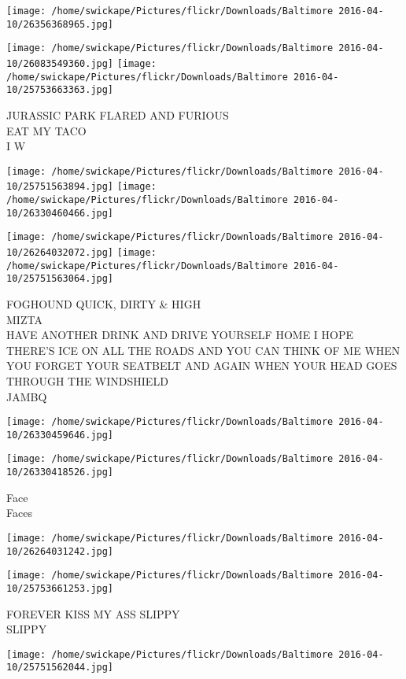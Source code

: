 \documentclass[10pt,letterpaper]{article}
\begin{document}
\texttt{[image: /home/swickape/Pictures/flickr/Downloads/Baltimore 2016-04-10/26356368965.jpg]}

\vspace{0.25in}
\texttt{[image: /home/swickape/Pictures/flickr/Downloads/Baltimore 2016-04-10/26083549360.jpg]}
\texttt{[image: /home/swickape/Pictures/flickr/Downloads/Baltimore 2016-04-10/25753663363.jpg]}

JURASSIC PARK FLARED AND FURIOUS\\
EAT MY TACO\\
I W
\pagebreak

\texttt{[image: /home/swickape/Pictures/flickr/Downloads/Baltimore 2016-04-10/25751563894.jpg]}
\texttt{[image: /home/swickape/Pictures/flickr/Downloads/Baltimore 2016-04-10/26330460466.jpg]}

\texttt{[image: /home/swickape/Pictures/flickr/Downloads/Baltimore 2016-04-10/26264032072.jpg]}
\texttt{[image: /home/swickape/Pictures/flickr/Downloads/Baltimore 2016-04-10/25751563064.jpg]}

FOGHOUND QUICK, DIRTY \& HIGH\\
MIZTA\\
HAVE ANOTHER DRINK AND DRIVE YOURSELF HOME I HOPE THERE'S ICE ON ALL THE ROADS AND YOU CAN THINK OF ME WHEN YOU FORGET YOUR SEATBELT AND AGAIN WHEN YOUR HEAD GOES THROUGH THE WINDSHIELD\\
JAMBQ
\pagebreak

\texttt{[image: /home/swickape/Pictures/flickr/Downloads/Baltimore 2016-04-10/26330459646.jpg]}

\vspace{0.25in}
\texttt{[image: /home/swickape/Pictures/flickr/Downloads/Baltimore 2016-04-10/26330418526.jpg]}

Face\\
Faces
\pagebreak

\texttt{[image: /home/swickape/Pictures/flickr/Downloads/Baltimore 2016-04-10/26264031242.jpg]}

\vspace{0.25in}
\texttt{[image: /home/swickape/Pictures/flickr/Downloads/Baltimore 2016-04-10/25753661253.jpg]}

FOREVER KISS MY ASS SLIPPY\\
SLIPPY
\pagebreak

\texttt{[image: /home/swickape/Pictures/flickr/Downloads/Baltimore 2016-04-10/25751562044.jpg]}
\end{document}
